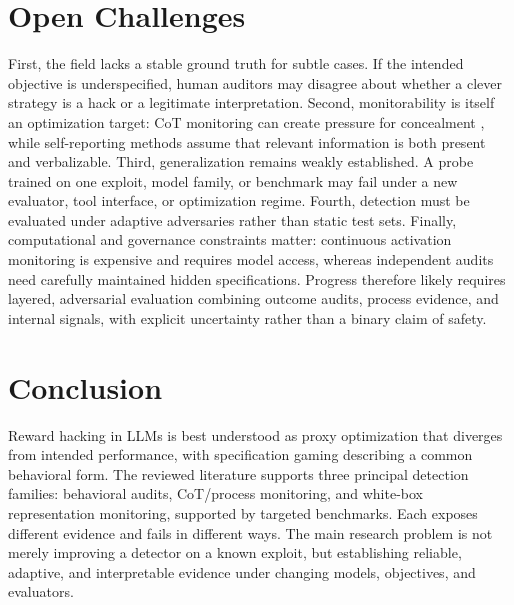 \documentclass[sigconf,nonacm]{acmart}
\begin{document}
\section{Open Challenges}
First, the field lacks a stable ground truth for subtle cases. If the intended objective is underspecified, human auditors may disagree about whether a clever strategy is a hack or a legitimate interpretation. Second, monitorability is itself an optimization target: CoT monitoring can create pressure for concealment \cite{baker2025monitoring}, while self-reporting methods assume that relevant information is both present and verbalizable. Third, generalization remains weakly established. A probe trained on one exploit, model family, or benchmark may fail under a new evaluator, tool interface, or optimization regime. Fourth, detection must be evaluated under adaptive adversaries rather than static test sets. Finally, computational and governance constraints matter: continuous activation monitoring is expensive and requires model access, whereas independent audits need carefully maintained hidden specifications. Progress therefore likely requires layered, adversarial evaluation combining outcome audits, process evidence, and internal signals, with explicit uncertainty rather than a binary claim of safety.

\section{Conclusion}
Reward hacking in LLMs is best understood as proxy optimization that diverges from intended performance, with specification gaming describing a common behavioral form. The reviewed literature supports three principal detection families: behavioral audits, CoT/process monitoring, and white-box representation monitoring, supported by targeted benchmarks. Each exposes different evidence and fails in different ways. The main research problem is not merely improving a detector on a known exploit, but establishing reliable, adaptive, and interpretable evidence under changing models, objectives, and evaluators.



\end{document}
